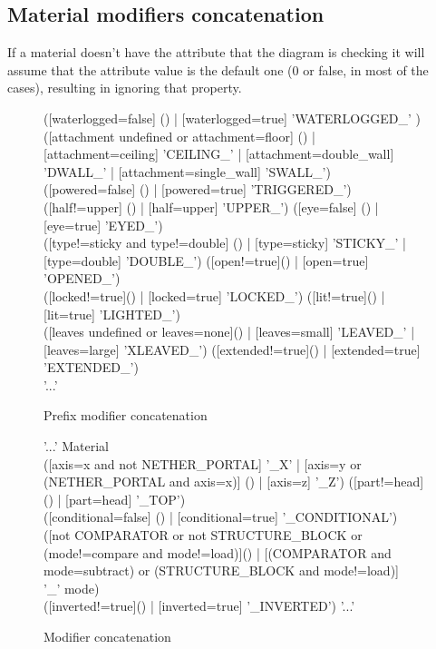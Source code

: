 \subsection{Material modifiers concatenation}

If a material doesn't have the attribute that the diagram is checking it will assume that the attribute value is the default one (0 or false, in most of the cases), resulting in ignoring that property.

\begin{subfigures}
	\begin{figure}
		\begin{rail}
			([waterlogged=false] () | [waterlogged=true] 'WATERLOGGED\_' ) ([attachment undefined or attachment=floor] () | [attachment=ceiling] 'CEILING\_' | [attachment=double\_wall] 'DWALL\_' | [attachment=single\_wall] 'SWALL\_') \\
			([powered=false] () | [powered=true] 'TRIGGERED\_') ([half!=upper] () | [half=upper] 'UPPER\_') ([eye=false] () | [eye=true] 'EYED\_') \\
			([type!=sticky and type!=double] () | [type=sticky] 'STICKY\_' | [type=double] 'DOUBLE\_') ([open!=true]() | [open=true] 'OPENED\_') \\
			([locked!=true]() | [locked=true] 'LOCKED\_') ([lit!=true]() | [lit=true] 'LIGHTED\_') \\
			([leaves undefined or leaves=none]() | [leaves=small] 'LEAVED\_' | [leaves=large] 'XLEAVED\_') ([extended!=true]() | [extended=true] 'EXTENDED\_') \\
			'...'
		\end{rail}
		\label{rail:modifier-concatenation}
		\caption{Prefix modifier concatenation}
	\end{figure}

	\begin{figure}
		\begin{rail}
			'...'
			Material \\
			([axis=x and not NETHER\_PORTAL] '\_X' | [axis=y or (NETHER\_PORTAL and axis=x)] () | [axis=z] '\_Z') ([part!=head]() | [part=head] '\_TOP') \\
			([conditional=false] () | [conditional=true] '\_CONDITIONAL') \\
			([not COMPARATOR or not STRUCTURE\_BLOCK or (mode!=compare and mode!=load)]() | [(COMPARATOR and mode=subtract) or (STRUCTURE\_BLOCK and mode!=load)] \\ '\_' mode) \\
			([inverted!=true]() | [inverted=true] '\_INVERTED')
			'...'
		\end{rail}
		\caption{Modifier concatenation}
	\end{figure}


\end{subfigures}
